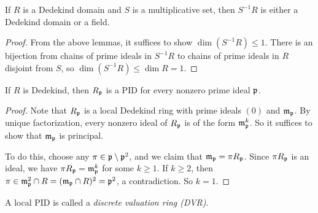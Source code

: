 \begin{prop}
  If $R$ is a Dedekind domain and $S$ is a multiplicative
  set, then $S^{-1} R$ is either a Dedekind domain or a field.
\end{prop}

\begin{proof}
  From the above lemmas, it suffices to show
  $\dim(S^{-1} R) \le 1$. There is an bijection from
  chains of prime ideals in $S^{-1} R$ to
  chains of prime ideals in $R$ disjoint from $S$, so
  $\dim(S^{-1} R) \le \dim R = 1$.
\end{proof}

\begin{corollary}
  If $R$ is Dedekind, then $R_{\mathfrak{p}}$ is a PID
  for every nonzero prime ideal $\mathfrak{p}$.
\end{corollary}

\begin{proof}
  Note that $R_{\mathfrak{p}}$ is a local Dedekind ring with
  prime ideals $(0)$ and $\mathfrak{m}_{\mathfrak{p}}$. By unique
  factorization, every nonzero ideal of $R_{\mathfrak{p}}$ is
  of the form $\mathfrak{m}_{\mathfrak{p}}^k$. So it suffices to show that
  $\mathfrak{m}_{\mathfrak{p}}$ is principal.

  To do this, choose any $\pi \in \mathfrak{p} \setminus \mathfrak{p}^2$,
  and we claim that $\mathfrak{m}_{\mathfrak{p}} = \pi R_{\mathfrak{p}}$.
  Since $\pi R_{\mathfrak{p}}$ is an ideal, we have
  $\pi R_{\mathfrak{p}} = \mathfrak{m}_{\mathfrak{p}}^k$ for some $k \ge 1$.
  If $k \ge 2$, then $\pi \in \mathfrak{m}_{\mathfrak{p}}^2 \cap R = (\mathfrak{m}_{\mathfrak{p}} \cap R)^2 = \mathfrak{p}^2$,
  a contradiction. So $k = 1$.
\end{proof}

\begin{definition}
  A local PID is called a \emph{discrete valuation ring (DVR)}.
\end{definition}
